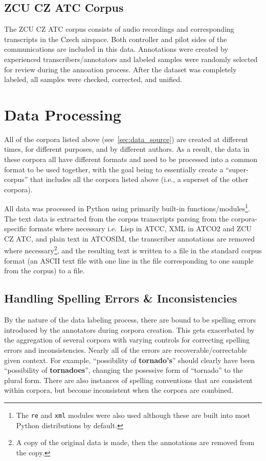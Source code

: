\documentclass[12pt]{article}
\begin{document}
\subsection{ZCU CZ ATC Corpus}\label{sec:zcu_atc}
The ZCU CZ ATC corpus consists of audio recordings and corresponding transcripts in the Czech airspace. Both controller and pilot sides of the
communications are included in this data. Annotations were created by experienced transcribers/annotators and labeled samples were randomly selected
for review during the annoation process. After the dataset was completely labeled, all samples were checked, corrected, and
unified\cite{smidl_air_2019}.

\section{Data Processing}\label{sec:data_processing}
All of the corpora listed above (see~\ref{sec:data_source}) are created at different times, for different purposes, and by different authors.
As a result, the data in these corpora all have different formats and need to be processed into a common format to be used together, with the goal
being to essentially create a ``super-corpus'' that includes all the corpora listed above (i.e., a superset of the other corpora).

All data was processed in Python using primarily built-in functions/modules\footnote{The \lstinline|re| and \lstinline|xml| modules were also used
    although these are built into most Python distributions by default.}. The text data is extracted from the corpus transcripts parsing from the
corpora-specific formats where necessary i.e.~Lisp in ATCC, XML in ATCO2 and ZCU CZ ATC, and plain text in ATCOSIM, the transcriber annotations
are removed where necessary\footnote{A copy of the original data is made, then the annotations are removed from the copy.}, and the resulting text
is written to a file in the standard corpus format (an ASCII text file with one line in the file corresponding to one sample from the corpus) to a
file.

\subsection{Handling Spelling Errors \& Inconsistencies}\label{sec:spelling_errors}
By the nature of the data labeling process, there are bound to be spelling errors introduced by the annotators during corpora creation. This gets
exacerbated by the aggregation of several corpora with varying controls for correcting spelling errors and inconsistencies. Nearly all of the errors
are recoverable/correctable given context. For example, ``possibility of \textbf{tornado's}'' should clearly have been
``possibility of \textbf{tornadoes}'', changing the posessive form of ``tornado'' to the plural form. There are also instances of spelling conventions
that are consistent within corpora, but become inconsistent when the corpora are combined.
\end{document}
